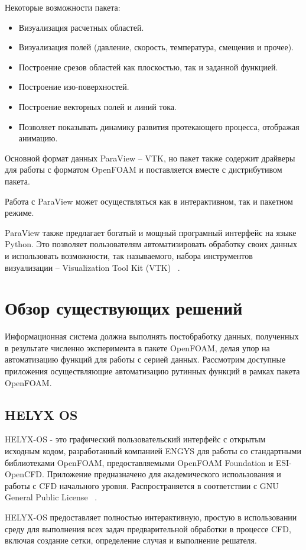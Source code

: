 \documentclass[14pt]{extreport}
\begin{document}
Некоторые возможности пакета:
\begin{itemize}
\item Визуализация расчетных областей.
\item Визуализация полей (давление, скорость, температура, смещения и прочее).
\item Построение срезов областей как плоскостью, так и заданной функцией.
\item Построение изо-поверхностей.
\item Построение векторных полей и линий тока.
\item Позволяет показывать динамику развития протекающего процесса, отображая анимацию. 
\end{itemize}

Основной формат данных ParaView -- VTK, но пакет также содержит драйверы для работы с форматом OpenFOAM и поставляется вместе с дистрибутивом пакета. 

Работа с ParaView может осуществляться как в интерактивном, так и пакетном режиме.

ParaView также предлагает богатый и мощный програмный интерфейс на языке Python. Это позволяет пользователям автоматизировать обработку своих данных и использовать возможности, так называемого, набора инструментов визуализации -- Visualization Tool Kit (VTK) ~\cite{ParaviewAndPython}.

\chapter{Обзор существующих решений}
Информационная система должна выполнять постобработку данных, полученных в результате численно эксперимента в пакете OpenFOAM, делая упор на автоматизацию функций для работы с серией данных. Рассмотрим доступные приложения осуществляющие автоматизацию рутинных функций в рамках пакета OpenFOAM.
\section{HELYX OS}
HELYX-OS - это графический пользовательский интерфейс с открытым исходным кодом, разработанный компанией ENGYS для работы со стандартными библиотеками OpenFOAM, предоставляемыми OpenFOAM Foundation и ESI-OpenCFD. Приложение предназначено для академического использования и работы с CFD начального уровня. Распространяется в соответствии с GNU General Public License ~\cite{Helyx}.

HELYX-OS предоставляет полностью интерактивную, простую в использовании среду для выполнения всех задач предварительной обработки в процессе CFD, включая создание сетки, определение случая и выполнение решателя.
\end{document}
